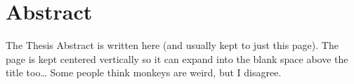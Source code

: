 \chapter*{Abstract}

\begin{otherlanguage}{american}
The Thesis Abstract is written here (and usually kept to just this page). The page is kept centered vertically so it can expand into the blank space above the title too\ldots
Some people think monkeys are weird, but I disagree.
\end{otherlanguage}

\clearpage